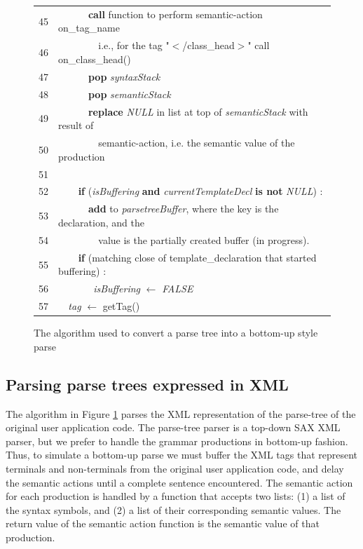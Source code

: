 \begin{figure}[ph]
\begin{tabular}{m{}m{}}
 45 & \verb+      +\textsf{\textbf{call} function to perform semantic-action on\_tag\_name} \\
 46 & \verb+        +\textsf{i.e., for the tag "$<$/class\_head$>$" call on\_class\_head()} \\
 47 & \verb+      +\textsf{\textbf{pop} \emph{syntaxStack}} \\
 48 & \verb+      +\textsf{\textbf{pop} \emph{semanticStack}} \\
 49 & \verb+      +\textsf{\textbf{replace} \emph{NULL} in list at top of \emph{semanticStack} with result of} \\
 50 & \verb+        +\textsf{semantic-action, i.e. the semantic value of the production} \\
 51 & \\
 52 & \verb+    +\textsf{\textbf{if} (\emph{isBuffering} \textbf{and} \emph{currentTemplateDecl} \textbf{is not} \emph{NULL}) :} \\
 53 & \verb+      +\textsf{\textbf{add} to \emph{parsetreeBuffer}, where the key is the declaration, and the} \\
 54 & \verb+        +\textsf{value is the partially created buffer (in progress).} \\
 55 & \verb+    +\textsf{\textbf{if} (matching close of template\_declaration that started buffering) :} \\
 56  & \verb+       +\textsf{\emph{isBuffering} $\leftarrow$ \emph{FALSE}} \\
 57 & \verb+  +\textsf{\emph{tag} $\leftarrow$ getTag()} \\
   \end{tabular}
\caption{The algorithm used to convert a parse tree into a bottom-up style parse}
\label{fig:asgcons}
\shortline
\end{figure}

\subsection{Parsing parse trees expressed in XML}

The algorithm in Figure \ref{fig:asgcons} parses the XML representation of the parse-tree 
of the original user application code.  The parse-tree parser is a 
top-down SAX XML parser, but we prefer to handle the grammar productions
in bottom-up fashion. 
Thus, to simulate a bottom-up parse we must buffer the XML tags
that represent terminals and non-terminals from the original user
application code, and delay the semantic actions until a complete
sentence encountered.
The semantic action for each production is handled by a function
that accepts two lists: (1) a list of the syntax symbols, and (2)
a list of their corresponding semantic values.  The return value of
the semantic action function is the semantic value of that production.

